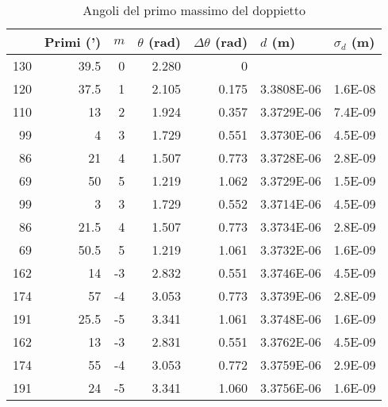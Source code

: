 \documentclass[a4paper,10pt]{article}
\begin{document}
	\begin{table}[htbp]
  \centering
  \caption{Angoli del primo massimo del doppietto}
  \medskip
    \begin{tabular}{rrrrrrr}
    \bottomrule
    \rowcolor[rgb]{ .267,  .447,  .769} \multicolumn{1}{l}{\textcolor[rgb]{ 1,  1,  1}{\textbf{Gradi (deg)}}} & \multicolumn{1}{l}{\textcolor[rgb]{ 1,  1,  1}{\textbf{Primi (')}}} & \multicolumn{1}{l}{\textcolor[rgb]{ 1,  1,  1}{\textbf{$m$}}} & \multicolumn{1}{l}{\textcolor[rgb]{ 1,  1,  1}{\textbf{$\theta$ (rad)}}} & \multicolumn{1}{l}{\textcolor[rgb]{ 1,  1,  1}{\textbf{$\Delta \theta$ (rad)}}} & \multicolumn{1}{l}{\textcolor[rgb]{ 1,  1,  1}{\textbf{$d$ (m)}}} & \multicolumn{1}{l}{\textcolor[rgb]{ 1,  1,  1}{\textbf{$\sigma _d$ (m)}}} \\
    \toprule
\rowcolor[rgb]{ .851,  .851,  .851} 130   & 39.5  & 0     & 2.280 & 0     &       &  \\
    120   & 37.5  & 1     & 2.105 & 0.175 & 3.3808E-06 & 1.6E-08 \\
    \rowcolor[rgb]{ .851,  .851,  .851} 110   & 13    & 2     & 1.924 & 0.357 & 3.3729E-06 & 7.4E-09 \\
    99    & 4     & 3     & 1.729 & 0.551 & 3.3730E-06 & 4.5E-09 \\
    \rowcolor[rgb]{ .851,  .851,  .851} 86    & 21    & 4     & 1.507 & 0.773 & 3.3728E-06 & 2.8E-09 \\
    69    & 50    & 5     & 1.219 & 1.062 & 3.3729E-06 & 1.5E-09 \\
    \rowcolor[rgb]{ .851,  .851,  .851} 99    & 3     & 3     & 1.729 & 0.552 & 3.3714E-06 & 4.5E-09 \\
    86    & 21.5  & 4     & 1.507 & 0.773 & 3.3734E-06 & 2.8E-09 \\
    \rowcolor[rgb]{ .851,  .851,  .851} 69    & 50.5  & 5     & 1.219 & 1.061 & 3.3732E-06 & 1.6E-09 \\
    162   & 14    & -3    & 2.832 & 0.551 & 3.3746E-06 & 4.5E-09 \\
    \rowcolor[rgb]{ .851,  .851,  .851} 174   & 57    & -4    & 3.053 & 0.773 & 3.3739E-06 & 2.8E-09 \\
    191   & 25.5  & -5    & 3.341 & 1.061 & 3.3748E-06 & 1.6E-09 \\
    \rowcolor[rgb]{ .851,  .851,  .851} 162   & 13    & -3    & 2.831 & 0.551 & 3.3762E-06 & 4.5E-09 \\
    174   & 55    & -4    & 3.053 & 0.772 & 3.3759E-06 & 2.9E-09 \\
    \rowcolor[rgb]{ .851,  .851,  .851} 191   & 24    & -5    & 3.341 & 1.060 & 3.3756E-06 & 1.6E-09 \\
    \toprule
    \end{tabular}%
  \label{tab1}%
\end{table}%
\end{document}
